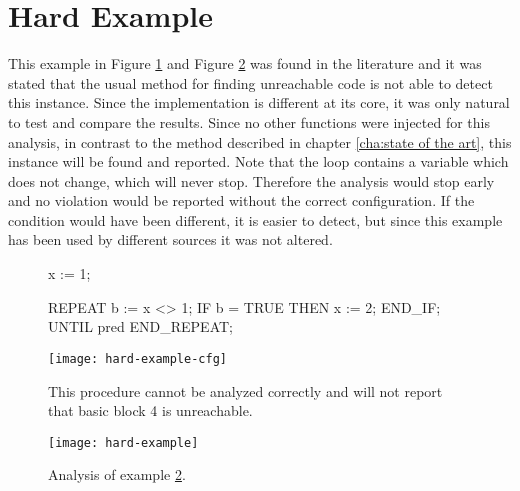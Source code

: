 \section{Hard Example}
This example in Figure \ref{code:hard example 1} and Figure \ref{code:hard example 1 cfg} was found in the literature \cite{Click_1995} and it was stated that the usual method for finding unreachable code is not able to detect this instance. 
Since the implementation is different at its core, it was only natural to test and compare the results.
Since no other functions were injected for this analysis, in contrast to the method described in chapter \ref{cha:state of the art}, this instance will be found and reported.
Note that the loop contains a variable which does not change, which will never stop. Therefore the analysis would stop early and no violation would be reported without the correct configuration. 
If the condition would have been different, it is easier to detect, but since this example has been used by different sources it was not altered.



\begin{figure}[hbt!]
	\begin{GenericCode}
x := 1;
	
REPEAT
	b := x <> 1;
	IF b = TRUE THEN
		x := 2;
	END_IF;    
UNTIL pred
END_REPEAT;	\end{GenericCode}
	\centering
	\texttt{[image: hard-example-cfg]}
	\caption{This procedure cannot be analyzed correctly and will not report that basic block 4 is unreachable. }
	\label{code:hard example 1}
\end{figure}
\begin{figure}[hbt!]
	\centering
	\texttt{[image: hard-example]}
	\caption{Analysis of example \ref{code:hard example 1 cfg}.}
	\label{code:hard example 1 cfg}
\end{figure}

